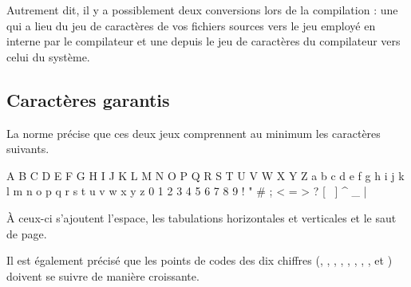 
\begin{infobox}
  Autrement dit, il y a possiblement
deux conversions lors de la compilation : une qui a lieu du jeu de
caractères de vos fichiers sources vers le jeu employé en interne par le
compilateur et une depuis le jeu de caractères du compilateur vers celui
du système.
\end{infobox}


\subsection{Caractères garantis}
\label{caracteres-garantis}

La norme précise que ces deux jeux comprennent au minimum les caractères
suivants.

\begin{C}
A  B  C  D  E  F  G  H  I  J  K  L  M
N  O  P  Q  R  S  T  U  V  W  X  Y  Z
a  b  c  d  e  f  g  h  i  j  k  l  m
n  o  p  q  r  s  t  u  v  w  x  y  z
0  1  2  3  4  5  6  7  8  9
!  "  #  %
;  <  =  >  ?  [  \  ]  ^  _  {  |  }  ~
\end{C}

À ceux-ci s'ajoutent l'espace, les tabulations horizontales et
verticales et le saut de page.

Il est également précisé que les points de codes des dix chiffres
(\mybox{\textquotesingle{}0\textquotesingle{}},
\mybox{\textquotesingle{}1\textquotesingle{}},
\mybox{\textquotesingle{}2\textquotesingle{}},
\mybox{\textquotesingle{}3\textquotesingle{}},
\mybox{\textquotesingle{}4\textquotesingle{}},
\mybox{\textquotesingle{}5\textquotesingle{}},
\mybox{\textquotesingle{}6\textquotesingle{}},
\mybox{\textquotesingle{}7\textquotesingle{}},
\mybox{\textquotesingle{}8\textquotesingle{}} et
\mybox{\textquotesingle{}9\textquotesingle{}}) doivent se suivre de
manière croissante.

